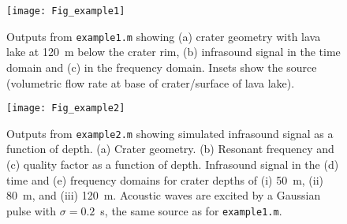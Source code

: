 \documentclass[10pt]{article}
\begin{document}
\begin{figure}[h!]
\centering
\texttt{[image: Fig\_example1]}
\caption{Outputs from \texttt{example1.m} showing (a) crater geometry with lava lake at 120~m below the crater rim, (b) infrasound signal in the time domain and (c) in the frequency domain. Insets show the source (volumetric flow rate at base of crater/surface of lava lake).}
\end{figure}

\begin{figure}[h!]
\centering
\texttt{[image: Fig\_example2]}
\caption{Outputs from \texttt{example2.m} showing simulated infrasound signal as a function of depth. (a) Crater geometry. (b) Resonant frequency and (c) quality factor as a function of depth. Infrasound signal in the (d) time and (e) frequency domains for crater depths of (i) 50~m, (ii) 80~m, and (iii) 120~m. Acoustic waves are excited by a Gaussian pulse with $\sigma=0.2$~s, the same source as for \texttt{example1.m}.}
\end{figure}
\end{document}
